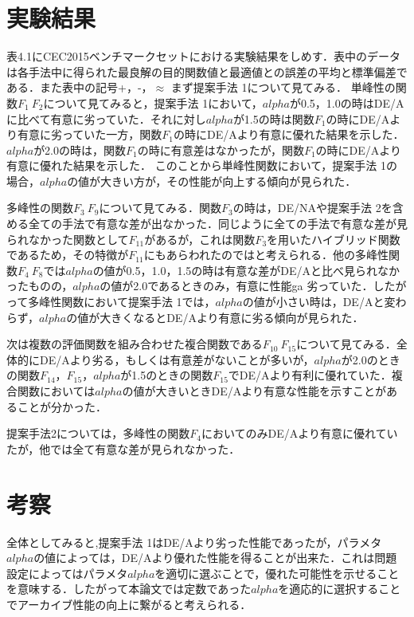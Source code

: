 \documentclass[a4paper,11pt,oneside,openany]{jsbook}
\begin{document}
\section{実験結果}
表4.1にCEC2015ベンチマークセットにおける実験結果をしめす．表中のデータは各手法中に得られた最良解の目的関数値と最適値との誤差の平均と標準偏差である．また表中の記号+，-，$\approx$
まず提案手法 1について見てみる．
単峰性の関数$F_{1}~F_{2}$について見てみると，提案手法 1において，$alpha$が0.5，1.0の時はDE/Aに比べて有意に劣っていた．それに対し$alpha$が1.5の時は関数$F_{1}$の時にDE/Aより有意に劣っていた一方，関数$F_{1}$の時にDE/Aより有意に優れた結果を示した．$alpha$が2.0の時は，関数$F_{1}$の時に有意差はなかったが，関数$F_{1}$の時にDE/Aより有意に優れた結果を示した．
このことから単峰性関数において，提案手法 1の場合，$alpha$の値が大きい方が，その性能が向上する傾向が見られた．

多峰性の関数$F_{3}~F_{9}$について見てみる．関数$F_{3}$の時は，DE/NAや提案手法 2を含める全ての手法で有意な差が出なかった．同じように全ての手法で有意な差が見られなかった関数として$F_{11}$があるが，これは関数$F_{3}$を用いたハイブリッド関数であるため，その特徴が$F_{11}$にもあらわれたのではと考えられる．他の多峰性関数$F_{4}~F_{8}$では$alpha$の値が0.5，1.0，1.5の時は有意な差がDE/Aと比べ見られなかったものの，$alpha$の値が2.0であるときのみ，有意に性能ga
劣っていた．したがって多峰性関数において提案手法 1では，$alpha$の値が小さい時は，DE/Aと変わらず，$alpha$の値が大きくなるとDE/Aより有意に劣る傾向が見られた．

次は複数の評価関数を組み合わせた複合関数である$F_{10}~F_{15}$について見てみる．全体的にDE/Aより劣る，もしくは有意差がないことが多いが，$alpha$が2.0のときの関数$F_{14}$，$F_{15}$，$alpha$が1.5のときの関数$F_{15}$でDE/Aより有利に優れていた．複合関数においては$alpha$の値が大きいときDE/Aより有意な性能を示すことがあることが分かった．

提案手法2については，多峰性の関数$F_{4}$においてのみDE/Aより有意に優れていたが，他では全て有意な差が見られなかった．

\section{考察}
全体としてみると,提案手法 1はDE/Aより劣った性能であったが，パラメタ$alpha$の値によっては，DE/Aより優れた性能を得ることが出来た．これは問題設定によってはパラメタ$alpha$を適切に選ぶことで，優れた可能性を示せることを意味する．したがって本論文では定数であった$alpha$を適応的に選択することでアーカイブ性能の向上に繋がると考えられる．
\end{document}
